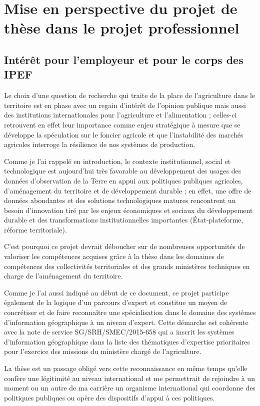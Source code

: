 \section[suites]
{Mise en perspective du projet de thèse dans le projet professionnel}

\subsection
{Intérêt pour l'employeur et pour le corps des IPEF}

Le choix d'une question de recherche qui traite de la place de l'agriculture
dans le territoire est en phase avec un regain d'intérêt de l'opinion publique
mais aussi des institutions internationales pour l'agriculture et
l'alimentation ; celles-ci retrouvent en effet leur importance comme enjeu
stratégique à mesure que se développe la spéculation sur le foncier agricole
et que l'instabilité des marchés agricoles interroge la résilience de nos
systèmes de production.

Comme je l'ai rappelé en introduction, le contexte institutionnel, social et
technologique est aujourd'hui très favorable au développement des usages des
données d’observation de la Terre en appui aux politiques publiques agricoles,
d’aménagement du territoire et de développement durable ; en effet, une offre
de données abondantes et des solutions technologiques matures rencontrent un
besoin d'innovation tiré par les enjeux économiques et sociaux du
développement durable et des transformations institutionnelles importantes
(État-plateforme, réforme territoriale).

C'est pourquoi ce projet devrait déboucher sur de nombreuses opportunités de
valoriser les compétences acquises grâce à la thèse dans les domaines de
compétences des collectivités territoriales et des grands ministères
techniques en charge de l'aménagement du territoire.

Comme je l'ai aussi indiqué au début de ce document, ce projet participe
également de la logique d'un parcours d'expert et constitue un moyen de
concrétiser et de faire reconnaître une spécialisation dans le domaine des
systèmes d'information géographique à un niveau d'expert. Cette démarche est
cohérente avec la note de service SG/SRH/SMEC/2015-658 qui a inscrit les
systèmes d'information géographique dans la liste des thématiques d'expertise
prioritaires pour l'exercice des missions du ministère chargé de
l'agriculture.

La thèse est un passage obligé vers cette reconnaissance en même temps qu'elle
confère une légitimité au niveau international et me permettrait de rejoindre
à un moment ou un autre de ma carrière un organisme international qui
coordonne des politiques publiques ou opère des dispositifs d'appui à ces
politiques.

